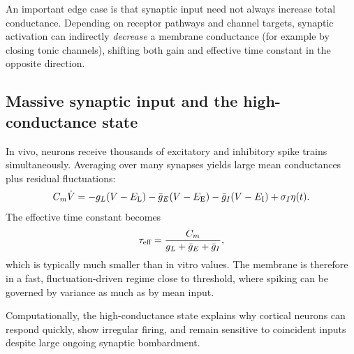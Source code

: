 An important edge case is that synaptic input need not always increase total conductance. Depending on receptor pathways and channel targets, synaptic activation can indirectly \emph{decrease} a membrane conductance (for example by closing tonic channels), shifting both gain and effective time constant in the opposite direction.

\subsection{Massive synaptic input and the high-conductance state}

In vivo, neurons receive thousands of excitatory and inhibitory spike trains simultaneously. Averaging over many synapses yields large mean conductances plus residual fluctuations:
%
\begin{equation}
  C_m\dot V = -g_L(V-E_{\mathrm{L}})-\bar g_E(V-E_{\mathrm{E}})-\bar g_I(V-E_{\mathrm{I}})+\sigma_I\eta(t).
  \label{eq:high-conductance}
\end{equation}
%
The effective time constant becomes
%
\begin{equation}
  \tau_{\text{eff}}=\frac{C_m}{g_L+\bar g_E+\bar g_I},
  \label{eq:tau-eff}
\end{equation}
%
which is typically much smaller than in vitro values. The membrane is therefore in a fast, fluctuation-driven regime close to threshold, where spiking can be governed by variance as much as by mean input.

Computationally, the high-conductance state explains why cortical neurons can respond quickly, show irregular firing, and remain sensitive to coincident inputs despite large ongoing synaptic bombardment.


